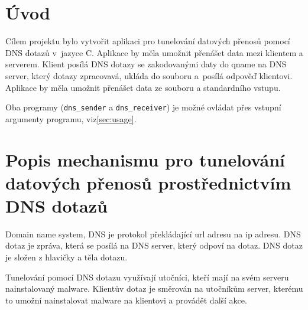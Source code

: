 \section{Úvod}
\label{sec:uvod}
Cílem projektu bylo vytvořit aplikaci pro tunelování datových přenosů pomocí
DNS dotazů v~jazyce C\@. Aplikace by měla umožnit přenášet data mezi klientem
a serverem.
Klient posílá DNS dotazy se zakodovanými daty do qname na DNS server,
který dotazy zpracovavá, ukláda do souboru a~posílá odpověď klientovi.
Aplikace by měla umožnit přenášet data ze souboru a standardního vstupu.

Oba programy (\texttt{dns\_sender} a \texttt{dns\_receiver}) je možné
ovládat přes vstupní argumenty programu, viz\ref{sec:usage}.



\section{Popis mechanismu pro tunelování datových přenosů prostřednictvím DNS dotazů}
\label{sec:popis-mechanismu-pro-tunelovani-datovych-prenosu-prostrednictvim-dns-dotazu}

Domain name system, DNS je protokol překládající url adresu na ip adresu.
DNS dotaz je zpráva, která se posílá na DNS server, který odpoví na dotaz.
DNS dotaz je složen z hlavičky a těla dotazu\cite{dnsPacket}.

Tunelování pomocí DNS dotazu využívají utočníci, kteří
mají na svém serveru nainstalovaný malware.
Klientův dotaz je směrován na utočníkům server, kterému to umožní
nainstalovat malware na klientovi a provádět další akce.
